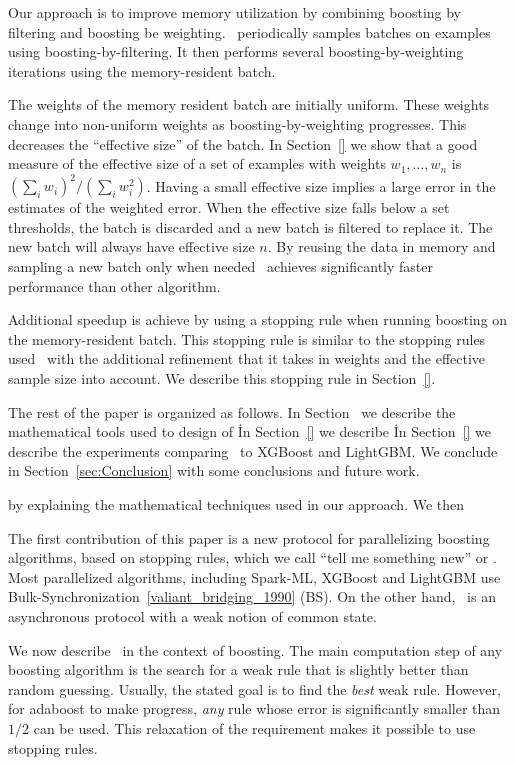 Our approach is to improve memory utilization by combining boosting by
filtering and boosting be weighting. \Sparrow\ periodically samples
batches on examples using boosting-by-filtering. It then performs several
boosting-by-weighting iterations using the memory-resident batch.

The weights of the memory resident batch are initially uniform. These
weights change into non-uniform weights as boosting-by-weighting
progresses. This decreases the ``effective size'' of the batch. In
Section~\ref{} we show that a good measure of the effective size of a
set of examples with weights $w_1,\ldots,w_n$ is $(\sum_i w_i)^2 /
(\sum_i w_i^2)$. Having a small effective size implies a large error
in the estimates of the weighted error. When the effective size falls
below a set thresholds, the batch is discarded and a new batch is
filtered to replace it. The new batch will always have effective size
$n$. By reusing the data in memory and sampling a new batch only when
needed \Sparrow\ achieves significantly faster performance than
other algorithm.

Additional speedup is achieve by using a stopping rule when
running boosting on the memory-resident batch. This stopping rule is
similar to the stopping rules
used~\cite{domingo_scaling_2000,bradley_filterboost:_2007} with the
additional refinement that it takes in weights and the effective
sample size into account. We describe this stopping rule in Section~\ref{}.

The rest of the paper is organized as follows. In Section~\cite{} we
describe the mathematical tools used to design of \Sparrow\. In
Section~\ref{} we describe \Sparrow\. In Section~\ref{} we describe
the experiments comparing \Sparrow\ to XGBoost and LightGBM. We
conclude in Section~\ref{sec:Conclusion} with some conclusions and
future work.

\iffalse
by explaining the
mathematical techniques used in our approach. We then 

The first contribution of this paper is a new protocol for
parallelizing boosting algorithms, based on stopping rules, which we
call ``tell me something new'' or \tmsn. Most parallelized algorithms,
including Spark-ML, XGBoost and LightGBM use
Bulk-Synchronization~\ref{valiant_bridging_1990} (BS). On the other
hand, \tmsn\ is an asynchronous protocol with a weak notion of common state.

We now describe \tmsn\ in the context of boosting.
The main computation step of any boosting algorithm is the search for
a weak rule that is slightly better than random guessing. Usually, the
stated goal is to find the {\em best} weak rule. However, for adaboost
to make progress, {\em any} rule whose error is significantly smaller
than $1/2$ can be used. This relaxation of the requirement makes it
possible to use stopping rules.


